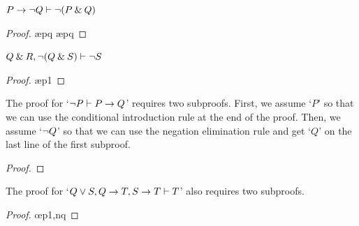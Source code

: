 {{{{{{{{{\begin{earg}
\item $P \rightarrow {\neg} Q \vdash {\neg}(P \mathbin{\&} Q)$

\begin{proof}
	 \pr{}	
	\open
		 \as{}
		 \ae{pq}
		 
		 \ae{pq}
	\close
	 
\end{proof}
\medskip

\begin{minipage}{10cm}
\item $Q \mathbin{\&} R, {\neg}(Q \mathbin{\&} S) \vdash {\neg} S$

\begin{proof}
	 \pr{}	
	 \pr{}
	\open
		 \as{}
		 \ae{p1}
		 
		 
	\close
	 
\end{proof}
\medskip
\end{minipage}


\item The proof for `${\neg} P \vdash P \rightarrow Q$' requires two subproofs. First, we assume `$P$' so that we can use the conditional introduction rule at the end of the proof. Then, we assume `${\neg} Q$' so that we can use the negation elimination rule and get `$Q$' on the last line of the first subproof.

\begin{proof}
	 \pr{}	
	\open
			\as{}
		\open
			 \as{}
			 
			 
		\close
		 
	\close
	 
\end{proof}
\medskip


\begin{minipage}{10cm}
\item The proof for  `$Q \vee S, Q \rightarrow T, S \rightarrow T \vdash T$' also requires two subproofs. 

\begin{proof}
	 \pr{}
	 \pr{}
	 \pr{}
	\open
		 \as{}
			\open
				 \as{}
				 \oe{p1,nq}
				 
				 
			\close
		 
		 
		 
	\close
	 
\end{proof}
\end{minipage}


\end{earg}}}}}}}}}}
